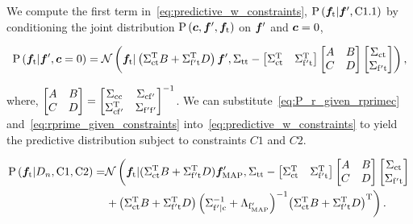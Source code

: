 We compute the first term in~\cref{eq:predictive_w_constraints},
$\prob{\vecf{f}[\tn{t}]|\vecf{f}', \tn{C1.1}}$ by conditioning the joint
distribution $\prob{\vecf{c}, \vecf{f}', \vecf{f}[\tn{t}]}$
on $\vecf{f}'$ and $\vecf{c} = 0$,
\begin{fullwidth}
\begin{align}
    \prob{\vecf{f}[\tn{t}] | \vecf{f}', \vecf{c}=0} = \mathcal{N} \left(
        \vecf{f}[\tn{t}] | 
        \left( \Sigma_\tn{ct}^\tn{T} B + \Sigma_\tn{f't}^\tn{T} D \right) 
            \vecf{f}', \Sigma_\tn{tt} - 
        \begin{bmatrix} 
            \Sigma_\tn{ct}^\tn{T} & \Sigma_\tn{f't}^\tn{T} 
        \end{bmatrix}
        \begin{bmatrix}
            A & B \\ C & D
        \end{bmatrix}
        \begin{bmatrix} \Sigma_\tn{ct} \\ \Sigma_\tn{f't} \end{bmatrix} \right),
        \label{eq:P_r_given_rprimec}
\end{align}
\end{fullwidth}
where,
    $\begin{bmatrix}
        A & B \\ C & D
    \end{bmatrix} = 
    \begin{bmatrix}
        \Sigma_{\mathrm{cc}} & \Sigma_{\mathrm{cf'}} \\ \Sigma_{\mathrm{cf'}}^{\mathrm{T}} &
        \Sigma_{\mathrm{f'f'}}
    \end{bmatrix}^{-1}$.
We can substitute~\cref{eq:P_r_given_rprimec}
and~\cref{eq:rprime_given_constraints} into~\cref{eq:predictive_w_constraints}
to yield the predictive distribution subject to constraints $C1$ and $C2$.
\begin{fullwidth}
\begin{align}
    \prob{\vecf{f}[\tn{t}]|D_n, \tn{C1}, \tn{C2}} = &\mathcal{N}
        \left( \vecf{f}[\tn{t}] | 
    (\Sigma_\tn{ct}^\tn{T} B + \Sigma_\tn{f't}^\tn{T} D) 
        \vecf{f}'_\tn{MAP}, \Sigma_\tn{tt} - 
        \begin{bmatrix} 
            \Sigma_\tn{ct}^\tn{T} & \Sigma_\tn{f't}^\tn{T} 
        \end{bmatrix}
        \begin{bmatrix}
            A & B \\ C & D
        \end{bmatrix}
        \begin{bmatrix} 
            \Sigma_\tn{ct} \\ \Sigma_\tn{f't} 
        \end{bmatrix} \right. \notag \\
        & \left. + \left( 
            \Sigma_\tn{ct}^\tn{T} B + \Sigma_\tn{f't}^\tn{T} D\right)
        {\left(\Sigma_\tn{f'|c}^{-1} + \Lambda_\tn{f'_{MAP}}\right)}^{-1}
        {\left(\Sigma_\tn{ct}^\tn{T} B + \Sigma_\tn{f't}^\tn{T} D
        \right)}^\tn{T} \right).
    \label{eq:pred_dist_constrain_xstar}
\end{align}
\end{fullwidth}
